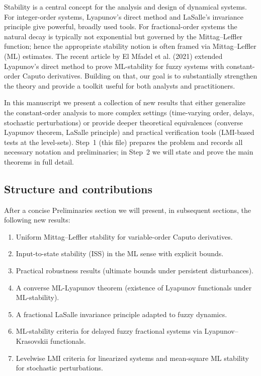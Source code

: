 \documentclass[11pt,a4paper]{article}
\theoremstyle{plain}
\theoremstyle{definition}
\theoremstyle{remark}
\begin{document}
	Stability is a central concept for the analysis and design of dynamical systems. For integer-order systems, Lyapunov's direct method and LaSalle's invariance principle give powerful, broadly used tools. For fractional-order systems the natural decay is typically not exponential but governed by the Mittag--Leffler function; hence the appropriate stability notion is often framed via Mittag--Leffler (ML) estimates. The recent article by El Mfadel et al. (2021) extended Lyapunov's direct method to prove ML-stability for fuzzy systems with constant-order Caputo derivatives. Building on that, our goal is to substantially strengthen the theory and provide a toolkit useful for both analysts and practitioners.
	
	In this manuscript we present a collection of new results that either generalize the constant-order analysis to more complex settings (time-varying order, delays, stochastic perturbations) or provide deeper theoretical equivalences (converse Lyapunov theorem, LaSalle principle) and practical verification tools (LMI-based tests at the level-sets). Step~1 (this file) prepares the problem and records all necessary notation and preliminaries; in Step~2 we will state and prove the main theorems in full detail.
	
	\subsection{Structure and contributions}
	After a concise Preliminaries section we will present, in subsequent sections, the following new results:
	\begin{enumerate}
		\item Uniform Mittag--Leffler stability for variable-order Caputo derivatives.
		\item Input-to-state stability (ISS) in the ML sense with explicit bounds.
		\item Practical robustness results (ultimate bounds under persistent disturbances).
		\item A converse ML-Lyapunov theorem (existence of Lyapunov functionals under ML-stability).
		\item A fractional LaSalle invariance principle adapted to fuzzy dynamics.
		\item ML-stability criteria for delayed fuzzy fractional systems via Lyapunov--Krasovskii functionals.
		\item Levelwise LMI criteria for linearized systems and mean-square ML stability for stochastic perturbations.
	\end{enumerate}
	
\end{document}
